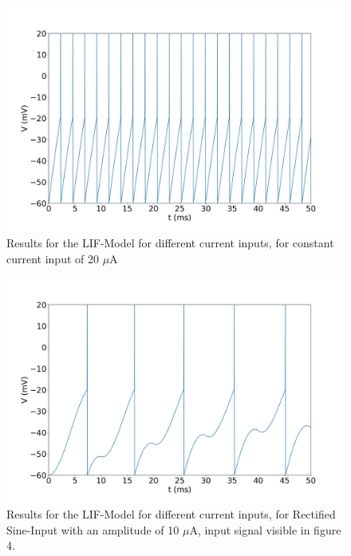 \documentclass{scrartcl}			%
\begin{document}
\begin{figure}[hbpt!]					%
	\centering
	\includegraphics[scale=0.32]{3_2.png}
	\captionsetup{width=\linewidth}  %
	\caption{Results for the LIF-Model for different current inputs, for constant current input of 20 $\mu$A}
	\label{subsec_fig2_2} %
\end{figure}

\begin{figure}[hbpt!]					%
	\centering
	\includegraphics[scale=0.33]{3_3.png}
	\captionsetup{width=\linewidth}  %
	\caption{Results for the LIF-Model for different current inputs, for Rectified Sine-Input with an amplitude of 10 $\mu$A, input signal visible in figure 4.}
	\label{subsec_fig2_3} %
\end{figure}
\end{document}
